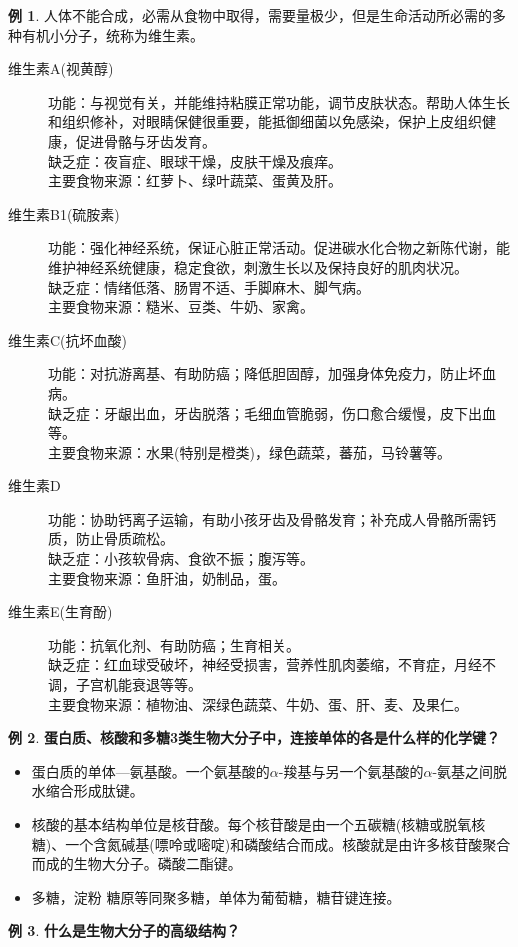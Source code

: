 \documentclass[UTF8]{article}
\theoremstyle{definition}
\newtheorem{example}{例}[section]
\begin{document}
\begin{example}
    人体不能合成，必需从食物中取得，需要量极少，但是生命活动所必需的多种有机小分子，统称为维生素。\begin{description}
        \item[维生素A(视黄醇)] 功能：与视觉有关，并能维持粘膜正常功能，调节皮肤状态。帮助人体生长和组织修补，对眼睛保健很重要，能抵御细菌以免感染，保护上皮组织健康，促进骨骼与牙齿发育。\\ 缺乏症：夜盲症、眼球干燥，皮肤干燥及痕痒。\\ 主要食物来源：红萝卜、绿叶蔬菜、蛋黄及肝。
        \item[维生素B1(硫胺素)]功能：强化神经系统，保证心脏正常活动。促进碳水化合物之新陈代谢，能维护神经系统健康，稳定食欲，刺激生长以及保持良好的肌肉状况。\\ 缺乏症：情绪低落、肠胃不适、手脚麻木、脚气病。\\ 主要食物来源：糙米、豆类、牛奶、家禽。 
        \item[维生素C(抗坏血酸)]功能：对抗游离基、有助防癌；降低胆固醇，加强身体免疫力，防止坏血病。\\ 缺乏症：牙龈出血，牙齿脱落；毛细血管脆弱，伤口愈合缓慢，皮下出血等。\\ 主要食物来源：水果(特别是橙类)，绿色蔬菜，蕃茄，马铃薯等。
        \item[维生素D]功能：协助钙离子运输，有助小孩牙齿及骨骼发育；补充成人骨骼所需钙质，防止骨质疏松。\\ 缺乏症：小孩软骨病、食欲不振；腹泻等。\\ 主要食物来源：鱼肝油，奶制品，蛋。 
        \item[维生素E(生育酚)]功能：抗氧化剂、有助防癌；生育相关。\\ 缺乏症：红血球受破坏，神经受损害，营养性肌肉萎缩，不育症，月经不调，子宫机能衰退等等。\\ 主要食物来源：植物油、深绿色蔬菜、牛奶、蛋、肝、麦、及果仁。
    \end{description}
\end{example}\begin{example}\textbf{蛋白质、核酸和多糖3类生物大分子中，连接单体的各是什么样的化学键？}
    
    \begin{itemize}
        \item 蛋白质的单体---氨基酸。一个氨基酸的$\alpha$-羧基与另一个氨基酸的$\alpha$-氨基之间脱水缩合形成肽键。
        \item 核酸的基本结构单位是核苷酸。每个核苷酸是由一个五碳糖(核糖或脱氧核糖)、一个含氮碱基(嘌呤或嘧啶)和磷酸结合而成。核酸就是由许多核苷酸聚合而成的生物大分子。磷酸二酯键。
        \item 多糖，淀粉 糖原等同聚多糖，单体为葡萄糖，糖苷键连接。
    \end{itemize}
\end{example}\begin{example}\textbf{什么是生物大分子的高级结构？ }
    

\end{example}
\end{document}
